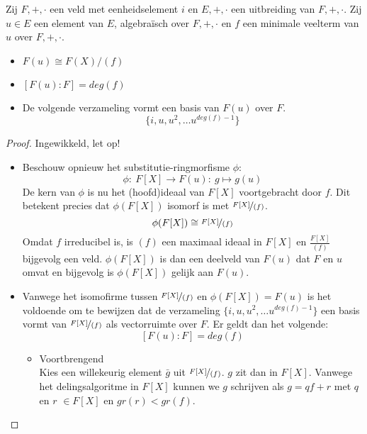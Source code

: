 \documentclass[main.tex]{subfiles}
\begin{document}
\begin{st}
  \examen
  \label{st:uitbreiding-van-algebraische-u-aan-veld-graad-minimale-veelterm}
  Zij $F,+,\cdot$ een veld met eenheidselement $i$ en $E,+,\cdot$ een uitbreiding van $F,+,\cdot$.
  Zij $u\in E$ een element van $E$, algebra\"isch over $F,+,\cdot$ en $f$ een minimale veelterm van $u$ over $F,+,\cdot$.
  \begin{itemize}
  \item $F(u) \cong F(X)/(f)$
  \item $[F(u):F] = deg(f)$
  \item De volgende verzameling vormt een basis van $F(u)$ over $F$.
  \[ \{ i,u,u^{2},\dotsc u^{deg(f)-1} \}\]
  \end{itemize}

  \begin{proof}
    Ingewikkeld, let op!
    \begin{itemize}
    \item Beschouw opnieuw het substitutie-ringmorfisme $\phi$:
      \[ \phi:\ F[X] \rightarrow F(u):\ g \mapsto g(u) \]
      De kern van $\phi$ is nu het (hoofd)ideaal van $F[X]$ voortgebracht door $f$.
      Dit betekent precies dat $\phi(F[X])$ isomorf is met $\nicefrac{F[X]}{(f)}$.
      \[ \phi(F[X]) \cong \nicefrac{F[X]}{(f)} \]
      Omdat $f$ irreducibel is, is $(f)$ een maximaal ideaal in $F[X]$ en $\frac{F[X]}{(f)}$ bijgevolg een veld.
      $\phi(F[X])$ is dan een deelveld van $F(u)$ dat $F$ en $u$ omvat en bijgevolg is $\phi(F[X])$ gelijk aan $F(u)$.
    \item Vanwege het isomofirme tussen $\nicefrac{F[X]}{(f)}$ en $\phi(F[X]) = F(u)$ is het voldoende om te bewijzen dat de verzameling $\{ i,u,u^{2},\dotsc u^{deg(f)-1} \}$ een basis vormt van $\nicefrac{F[X]}{(f)}$ als vectorruimte over $F$.
      Er geldt dan het volgende:
      \[ [F(u):F] = deg(f) \]
      \begin{itemize}
      \item Voortbrengend\\
        Kies een willekeurig element $\bar{g}$ uit $\nicefrac{F[X]}{(f)}$.
        $g$ zit dan in $F[X]$.
        Vanwege het delingsalgoritme in $F[X]$ kunnen we $g$ schrijven als $g=qf+r$ met $q$ en $r$ $\in F[X]$ en $gr(r) < gr(f)$.

\end{itemize}
\end{itemize}
\end{proof}
\end{st}
\end{document}
